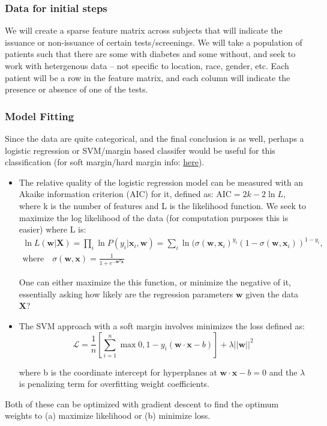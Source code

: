 \documentclass{article}
\begin{document}
\subsubsection{Data for initial steps}

We will create a sparse feature matrix across subjects that will indicate the issuance or non-issuance of certain tests/screenings. We will take a population of patients such that there are some with diabetes and some without, and seek to work with hetergenous data -- not specific to location, race, gender, etc. Each patient will be a row in the feature matrix, and each column will indicate the presence or absence of one of the tests. 


\subsubsection{Model Fitting} 
Since the data are quite categorical, and the final conclusion is as well, perhaps a logistic regression or SVM/margin based classifer would be useful for this classification (for soft margin/hard margin info: \href{https://github.com/harvard-ml-courses/cs181-lectures/blob/master/10.handout.pdf}{here}). \begin{itemize}

\item The relative quality of the logistic regression model can be measured with an Akaike information criterion (AIC) for it, defined as: $ \textrm{AIC} = 2k - 2 \ln L$, where k is the number of features and L is the likelihood function. We seek to maximize the log likelihood of the data (for computation purposes this is easier) where L is: \begin{gather}
\ln L(\mathbf{w} | \mathbf{X}) = \prod_{i} \ln P(y_i |\mathbf{x}_i, \mathbf{w}) = \sum_{i} \ln(\sigma(\mathbf{w},\mathbf{x}_i)^{y_i} (1 - \sigma(\mathbf{w},\mathbf{x}_i))^{1-y_i} ,  \\  \textrm{where}  \quad \sigma(\mathbf{w},\mathbf{x}) = \frac{1}{1 +e^{-\mathbf{w}^T \mathbf{x}}} \qquad
\end{gather}

One can either maximize the this function, or minimize the negative of it, essentially asking how likely are the regression parameters $\mathbf{w}$ given the data $\mathbf{X}$?

\item The SVM approach with a soft margin involves minimizes the loss defined as:
\begin{equation}
\mathcal{L} = \frac{1}{n} [\sum_{i=1}^{n} \max{0, 1-y_i (\mathbf{w} \cdot \mathbf{x} - b) }] + \lambda ||\mathbf{w}||^2
\end{equation}

where b is the coordinate intercept for hyperplanes at $\mathbf{w} \cdot \mathbf{x} - b = 0$ and the $\lambda$ is penalizing term for overfitting weight coefficients.
\end{itemize}
Both of these can be optimized with gradient descent to find the optimum weights to (a) maximize likelihood or (b) minimize loss.
\end{document}
